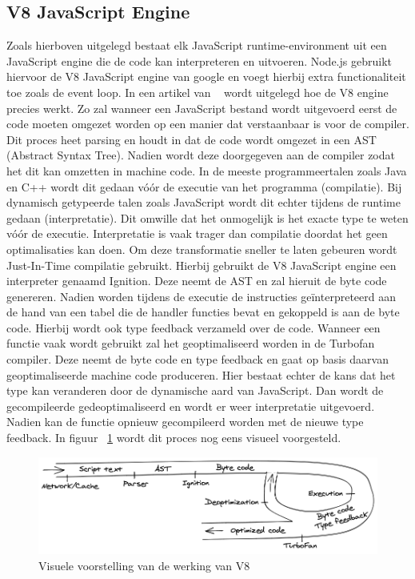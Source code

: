 \subsection{V8 JavaScript Engine}
Zoals hierboven uitgelegd bestaat elk JavaScript runtime-environment uit een JavaScript engine die de code kan interpreteren en uitvoeren.
Node.js gebruikt hiervoor de V8 JavaScript engine van google en voegt hierbij extra functionaliteit toe zoals de event loop.
In een artikel van ~\textcite{Lyamkin2020} wordt uitgelegd hoe de V8 engine precies werkt. 
Zo zal wanneer een JavaScript bestand wordt uitgevoerd eerst de code moeten omgezet worden op een manier dat verstaanbaar is voor de compiler.
Dit proces heet parsing en houdt in dat de code wordt omgezet in een AST (Abstract Syntax Tree). 
Nadien wordt deze doorgegeven aan de compiler zodat het dit kan omzetten in machine code. 
In de meeste programmeertalen zoals Java en C++ wordt dit gedaan vóór de executie van het programma (compilatie).
Bij dynamisch getypeerde talen zoals JavaScript wordt dit echter tijdens de runtime gedaan (interpretatie). 
Dit omwille dat het onmogelijk is het exacte type te weten vóór de executie.
Interpretatie is vaak trager dan compilatie doordat het geen optimalisaties kan doen.
Om deze transformatie sneller te laten gebeuren wordt Just-In-Time compilatie gebruikt.
Hierbij gebruikt de V8 JavaScript engine een interpreter genaamd Ignition. Deze neemt de AST en zal hieruit de byte code genereren.
Nadien worden tijdens de executie de instructies geïnterpreteerd aan de hand van een tabel die de handler functies bevat en gekoppeld 
is aan de byte code.
Hierbij wordt ook type feedback verzameld over de code. 
Wanneer een functie vaak wordt gebruikt zal het geoptimaliseerd worden in de Turbofan compiler.
Deze neemt de byte code en type feedback en gaat op basis daarvan geoptimaliseerde machine code produceren.
Hier bestaat echter de kans dat het type kan veranderen door de dynamische aard van JavaScript. 
Dan wordt de gecompileerde gedeoptimaliseerd en wordt er weer interpretatie uitgevoerd.
Nadien kan de functie opnieuw gecompileerd worden met de nieuwe type feedback.
In figuur ~\ref{fig:v8} wordt dit proces nog eens visueel voorgesteld.
\begin{figure}[h]
    \centering
    \includegraphics[width=.9\textwidth]{graphics/v8.png}
    \caption{\label{fig:v8}Visuele voorstelling van de werking van V8 ~\autocite{Lyamkin2020}}
\end{figure}

